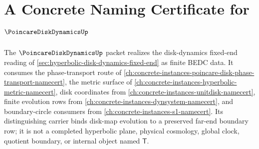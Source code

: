 \chapter{A Concrete Naming Certificate for $\PoincareDiskDynamicsUp$}
\label{ch:concrete-instances-poincare-disk-dynamics-namecert}

The $\PoincareDiskDynamicsUp$ packet realizes the disk-dynamics fixed-end reading of \autoref{sec:hyperbolic-disk-dynamics-fixed-end} as finite BEDC data. It consumes the phase-transport route of \autoref{ch:concrete-instances-poincare-disk-phase-transport-namecert}, the metric surface of \autoref{ch:concrete-instances-hyperbolic-metric-namecert}, disk coordinates from \autoref{ch:concrete-instances-unitdisk-namecert}, finite evolution rows from \autoref{ch:concrete-instances-dynsystem-namecert}, and boundary-circle consumers from \autoref{ch:concrete-instances-s1-namecert}. Its distinguishing carrier binds disk-map evolution to a preserved far-end boundary row; it is not a completed hyperbolic plane, physical cosmology, global clock, quotient boundary, or internal object named $\mathsf{T}$.

